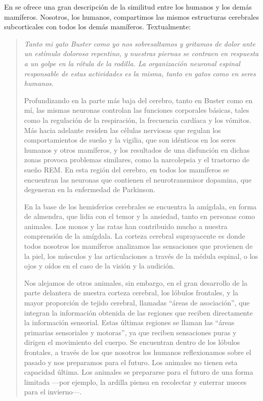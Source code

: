En \cite{Morrison2009} se ofrece una gran descripción de la similitud entre los humanos y los demás mamíferos. Nosotros, los humanos, compartimos las mismos estructuras cerebrales subcorticales con todos los demás mamíferos. Textualmente:


\begin{quote}

{\it Tanto mi gato Buster como yo nos sobresaltamos y gritamos de dolor ante un estímulo doloroso repentino, y nuestras piernas se contraen en respuesta a un golpe en la rótula de la rodilla. La organización neuronal espinal responsable de estas actividades es la misma, tanto en gatos como en seres humanos.

Profundizando en la parte más baja del cerebro, tanto en Buster como en mí, las mismas neuronas controlan las funciones corporales básicas, tales como la regulación de la respiración, la frecuencia cardíaca y los vómitos. Más hacia adelante residen las células nerviosas que regulan los comportamientos de sueño y la vigilia, que son idénticos en los seres humanos y otros mamíferos, y los resultados de una disfunción en dichas zonas provoca problemas similares, como la narcolepsia  y el trastorno de sueño \acs{REM}. En esta región del cerebro, en todos los mamíferos se encuentran las neuronas que contienen el neurotransmisor dopamina, que degeneran en la enfermedad de Parkinson.

En la base de los hemisferios cerebrales se encuentra la amígdala, en forma de almendra, que lidia con el temor y la ansiedad, tanto en personas como animales. Los monos y las ratas han contribuido mucho a nuestra comprensión de la amígdala. La corteza cerebral suprayacente es donde todos nosotros los mamíferos analizamos las sensaciones que provienen de la piel, los músculos y las articulaciones a través de la médula espinal, o los ojos y oídos en el caso de la visión y la audición.

Nos alejamos de otros animales, sin embargo, en el gran desarrollo de la parte delantera de nuestra corteza cerebral, los lóbulos frontales, y la mayor proporción de tejido cerebral, llamadas ``áreas de asociación'', que integran la información obtenida de las regiones que reciben directamente la información sensorial. Estas últimas regiones se llaman las ``áreas primarias sensoriales y motoras'', ya que reciben sensaciones puras y dirigen el movimiento del cuerpo. Se encuentran dentro de los lóbulos frontales, a través de los que nosotros los humanos reflexionamos sobre el pasado y nos preparamos para el futuro. Los animales no tienen esta capacidad última. Los animales se prepararse para el futuro de una forma limitada ---por ejemplo, la ardilla piensa en recolectar y enterrar nueces para el invierno---.}

\end{quote}


